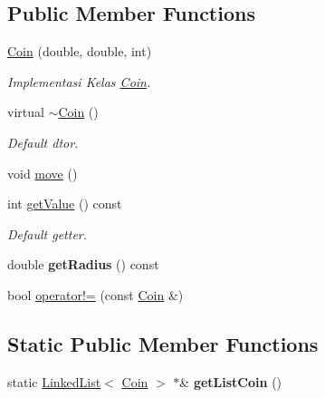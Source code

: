 \subsection*{Public Member Functions}
\begin{DoxyCompactItemize}
\item 
\mbox{\hyperlink{class_coin_af43cdebaaa8fa44389197213e4340f0d}{Coin}} (double, double, int)
\begin{DoxyCompactList}\small\item\em Implementasi Kelas \mbox{\hyperlink{class_coin}{Coin}}. \end{DoxyCompactList}\item 
\mbox{\label{class_coin_ad0371a6d98c194a0f6de615206829b16}} 
virtual \mbox{\hyperlink{class_coin_ad0371a6d98c194a0f6de615206829b16}{$\sim$\+Coin}} ()
\begin{DoxyCompactList}\small\item\em Default dtor. \end{DoxyCompactList}\item 
void \mbox{\hyperlink{class_coin_ab62bca5834489b9b483deaa3ca3470e9}{move}} ()
\item 
\mbox{\label{class_coin_a53c8bf65afdde1422cfda51d753d74b7}} 
int \mbox{\hyperlink{class_coin_a53c8bf65afdde1422cfda51d753d74b7}{get\+Value}} () const
\begin{DoxyCompactList}\small\item\em Default getter. \end{DoxyCompactList}\item 
\mbox{\label{class_coin_a498c92e5fe33000f3ab6ba583e538c91}} 
double {\bfseries get\+Radius} () const
\item 
bool \mbox{\hyperlink{class_coin_a551d7fe1d719474f0e4cbf5930d09a78}{operator!=}} (const \mbox{\hyperlink{class_coin}{Coin}} \&)
\end{DoxyCompactItemize}
\subsection*{Static Public Member Functions}
\begin{DoxyCompactItemize}
\item 
\mbox{\label{class_coin_a4c410d6d841379928cd5784fd910354e}} 
static \mbox{\hyperlink{class_linked_list}{Linked\+List}}$<$ \mbox{\hyperlink{class_coin}{Coin}} $>$ $\ast$\& {\bfseries get\+List\+Coin} ()
\end{DoxyCompactItemize}


